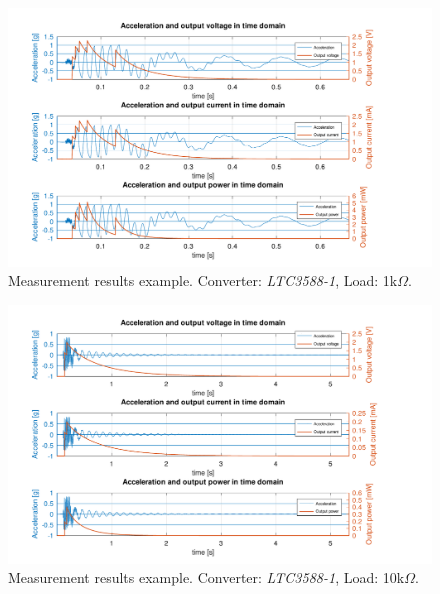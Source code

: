 \documentclass[12pt,a4paper]{article}
\begin{document}
\begin{landscape} 
\begin{figure}[ht!]
\includegraphics[scale=1.05]{timedomainltc35881k.pdf}
\caption{Measurement results example. Converter: \textit{LTC3588-1}, Load: 1k$\Omega$.}
\label{fig:timedomainltc35881k}
\end{figure}
\end{landscape}

\begin{landscape} 
\begin{figure}[ht!]
\includegraphics[scale=1.05]{timedomainltc358810k.pdf}
\caption{Measurement results example. Converter: \textit{LTC3588-1}, Load: 10k$\Omega$.}
\label{fig:timedomainltc358810k}
\end{figure}
\end{landscape}
\end{document}
